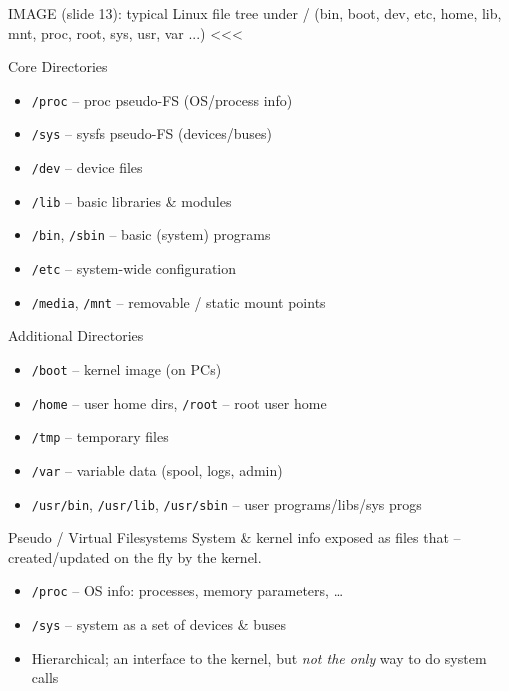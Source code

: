 IMAGE (slide 13): typical Linux file tree under / (bin, boot, dev, etc, home, lib, mnt, proc, root, sys, usr, var ...) <<<


\begin{definition}{Core Directories}
    \begin{itemize}
        \item \texttt{/proc} -- proc pseudo-FS (OS/process info)
        \item \texttt{/sys} -- sysfs pseudo-FS (devices/buses)
        \item \texttt{/dev} -- device files
        \item \texttt{/lib} -- basic libraries \& modules
        \item \texttt{/bin}, \texttt{/sbin} -- basic (system) programs
        \item \texttt{/etc} -- system-wide configuration
        \item \texttt{/media}, \texttt{/mnt} -- removable / static mount points
    \end{itemize}
\end{definition}

\begin{definition}{Additional Directories}
    \begin{itemize}
        \item \texttt{/boot} -- kernel image (on PCs)
        \item \texttt{/home} -- user home dirs, \texttt{/root} -- root user home
        \item \texttt{/tmp} -- temporary files
        \item \texttt{/var} -- variable data (spool, logs, admin)
        \item \texttt{/usr/bin}, \texttt{/usr/lib}, \texttt{/usr/sbin} -- user programs/libs/sys progs
    \end{itemize}
\end{definition}

\multend

\begin{concept}{Pseudo / Virtual Filesystems}
    System \& kernel info exposed as files that  -- created/updated on the fly by the kernel.
    \begin{itemize}
        \item \texttt{/proc} -- OS info: processes, memory parameters, \dots
        \item \texttt{/sys} -- system as a set of devices \& buses
        \item Hierarchical; an interface to the kernel, but \emph{not the only} way
              to do system calls
    \end{itemize}
\end{concept}


